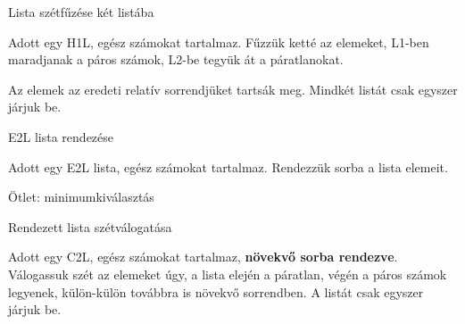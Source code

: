 \documentclass[hungarian]{beamer}
\begin{document}
\begin{frame}[t]{Lista szétfűzése két listába}

Adott egy H1L, egész számokat tartalmaz. Fűzzük ketté az elemeket, L1-ben maradjanak a páros számok, L2-be tegyük át a páratlanokat.

Az elemek az eredeti relatív sorrendjüket tartsák meg. Mindkét listát csak egyszer járjuk be.
    
\end{frame}

\begin{frame}[t]{E2L lista rendezése}

Adott egy E2L lista, egész számokat tartalmaz. Rendezzük sorba a lista elemeit.

Ötlet: minimumkiválasztás

\end{frame}

\begin{frame}[t]{Rendezett lista szétválogatása}

Adott egy C2L, egész számokat tartalmaz, \textbf{növekvő sorba rendezve}. Válogassuk szét az elemeket úgy, a lista elején a páratlan, végén a páros számok legyenek, külön-külön továbbra is növekvő sorrendben. A listát csak egyszer járjuk be.

\end{frame}
\end{document}
